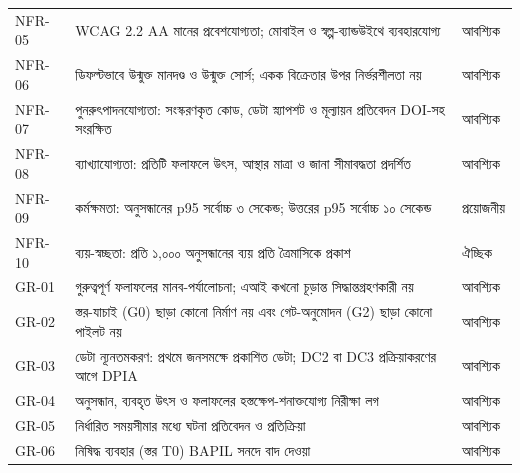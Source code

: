 \documentclass[border=10pt]{standalone}
\begin{document}
\begin{minipage}{17cm}
\begin{tabularx}{\linewidth}{@{}>{\hsize=0.422\hsize\raggedright\arraybackslash}X>{\hsize=2.156\hsize\raggedright\arraybackslash}X>{\hsize=0.422\hsize\raggedright\arraybackslash}X@{}}
NFR-05 & WCAG 2.2 AA মানের প্রবেশযোগ্যতা; মোবাইল ও স্বল্প-ব্যান্ডউইথে ব্যবহারযোগ্য & আবশ্যিক \\
NFR-06 & ডিফল্টভাবে উন্মুক্ত মানদণ্ড ও উন্মুক্ত সোর্স; একক বিক্রেতার উপর নির্ভরশীলতা নয় & আবশ্যিক \\
NFR-07 & পুনরুৎপাদনযোগ্যতা: সংস্করণকৃত কোড, ডেটা স্ন্যাপশট ও মূল্যায়ন প্রতিবেদন DOI-সহ সংরক্ষিত & আবশ্যিক \\
NFR-08 & ব্যাখ্যাযোগ্যতা: প্রতিটি ফলাফলে উৎস, আস্থার মাত্রা ও জানা সীমাবদ্ধতা প্রদর্শিত & আবশ্যিক \\
NFR-09 & কর্মক্ষমতা: অনুসন্ধানের p95 সর্বোচ্চ ৩ সেকেন্ড; উত্তরের p95 সর্বোচ্চ ১০ সেকেন্ড & প্রয়োজনীয় \\
NFR-10 & ব্যয়-স্বচ্ছতা: প্রতি ১,০০০ অনুসন্ধানের ব্যয় প্রতি ত্রৈমাসিকে প্রকাশ & ঐচ্ছিক \\
GR-01 & গুরুত্বপূর্ণ ফলাফলের মানব-পর্যালোচনা; এআই কখনো চূড়ান্ত সিদ্ধান্তগ্রহণকারী নয় & আবশ্যিক \\
GR-02 & স্তর-যাচাই (G0) ছাড়া কোনো নির্মাণ নয় এবং গেট-অনুমোদন (G2) ছাড়া কোনো পাইলট নয় & আবশ্যিক \\
GR-03 & ডেটা ন্যূনতমকরণ: প্রথমে জনসমক্ষে প্রকাশিত ডেটা; DC2 বা DC3 প্রক্রিয়াকরণের আগে DPIA & আবশ্যিক \\
GR-04 & অনুসন্ধান, ব্যবহৃত উৎস ও ফলাফলের হস্তক্ষেপ-শনাক্তযোগ্য নিরীক্ষা লগ & আবশ্যিক \\
GR-05 & নির্ধারিত সময়সীমার মধ্যে ঘটনা প্রতিবেদন ও প্রতিক্রিয়া & আবশ্যিক \\
GR-06 & নিষিদ্ধ ব্যবহার (স্তর T0) BAPIL সনদে বাদ দেওয়া & আবশ্যিক \\
\bottomrule
\end{tabularx}
\par\vspace{5pt}{\footnotesize\itshape অগ্রাধিকার MoSCoW রীতি অনুসরণ করে (আবশ্যিক, প্রয়োজনীয়, ঐচ্ছিক)। সংযুক্তি ক ১৬টি প্রয়োজনীয়তাকে উপাদান, কোড মডিউল ও পরীক্ষা বা পাইলট গ্রহণের সঙ্গে সংযুক্ত করে; বাকিগুলো পাইলট গ্রহণের মানদণ্ড, নিরাপত্তা পরীক্ষা বা শাসনগত পর্যালোচনার মাধ্যমে যাচাই করা হয়।}
\par{}
\end{minipage}
\end{document}
